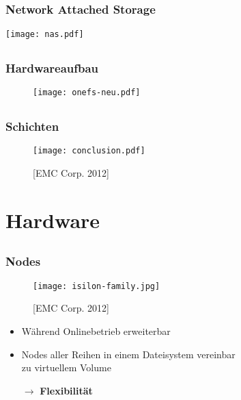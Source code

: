 \documentclass{beamer}
\begin{document}
\subsection{}
\begin{frame}[fragile]
  \frametitle{Network Attached Storage}
  \begin{center}\texttt{[image: nas.pdf]}\end{center}
\end{frame}

\subsection{}
\begin{frame}[fragile]
  \frametitle{Hardwareaufbau}
  
  \begin{figure}[htp]
    \centering
    \texttt{[image: onefs-neu.pdf]}
  \end{figure}

\end{frame}


\subsection{}
\begin{frame}[fragile]
  \frametitle{Schichten}
  
  \begin{figure}[htp]
    \centering
    \texttt{[image: conclusion.pdf]}
    \caption{[EMC Corp. 2012]}
  \end{figure}

\end{frame}

\section{Hardware}

\subsection{}

  \begin{frame}[fragile]
  \frametitle{Nodes}
  
  \begin{figure}[htp]
    \centering
    \texttt{[image: isilon-family.jpg]}
    \caption{[EMC Corp. 2012]}
  \end{figure}
  
  \vspace{-5mm}
  
  \begin{itemize}
    \item Während Onlinebetrieb erweiterbar
    \item Nodes aller Reihen in einem Dateisystem vereinbar \\
    zu virtuellem Volume 
    \vspace{1mm}
    \item[$\rightarrow$] \textbf{Flexibilität}
    \end{itemize}

\end{frame}
\end{document}
